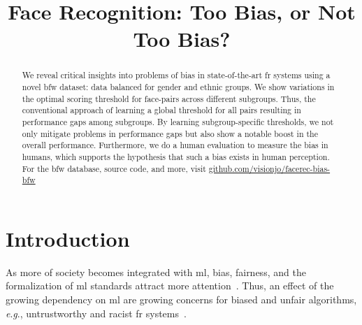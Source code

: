 \documentclass[10pt,twocolumn,letterpaper]{article}
\newcommand{\eg}{\textit{e}.\textit{g}., }
\begin{document}
\title{Face Recognition: Too Bias, or Not Too Bias?}


\maketitle

\begin{abstract}
We reveal critical insights into problems of bias in state-of-the-art \gls{fr} systems using a novel \gls{bfw} dataset: data balanced for gender and ethnic groups. We show variations in the optimal scoring threshold for face-pairs across different subgroups. Thus, the conventional approach of learning a  global threshold for all pairs resulting in performance gaps among subgroups. By learning subgroup-specific thresholds, we not only mitigate problems in performance gaps but also show a notable boost in the overall performance. Furthermore, we do a human evaluation to measure the bias in humans, which supports the hypothesis that such a bias exists in human perception. For the \gls{bfw} database, source code, and more, visit \href{https://github.com/visionjo/facerec-bias-bfw}{github.com/visionjo/facerec-bias-bfw}
\end{abstract}



\glsresetall
\section{Introduction}
    As more of society becomes integrated with \gls{ml}, bias, fairness, and the formalization of \gls{ml} standards attract more attention~\cite{10.1007/978-3-030-13469-3_68, anne2018women, wang2018racial}. Thus, an effect of the growing dependency on \gls{ml} are growing concerns for biased and unfair algorithms, \eg untrustworthy and racist \gls{fr} systems~\cite{england2019,snow2018}.
    
\end{document}
